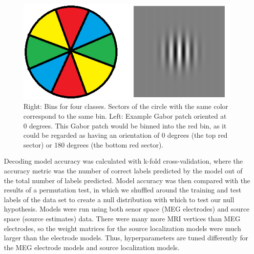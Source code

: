 \documentclass[../main.tex]{subfiles}
\begin{document}
\begin{figure}
    \centering
    \includegraphics{figures/methods/gabor_bins.png}
    \caption{Right: Bins for four classes. Sectors of the circle with the same color correspond to the same bin. Left: Example Gabor patch oriented at 0 degrees. This Gabor patch would be binned into the red bin, as it could be regarded as having an orientation of 0 degrees (the top red sector) or 180 degrees (the bottom red sector).}
    \label{gabor_bins}
\end{figure}

Decoding model accuracy was calculated with k-fold cross-validation, where the accuracy metric was the number of correct labels predicted by the model out of the total number of labels predicted. Model accuracy was then compared with the results of a permutation test, in which we shuffled around the training and test labels of the data set to create a null distribution with which to test our null hypothesis. Models were run using both senor space (MEG electrodes) and source space (source estimates) data. There were many more MRI vertices than MEG electrodes, so the weight matrices for the source localization models were much larger than the electrode models. Thus, hyperparameters are tuned differently for the MEG electrode models and source localization models.
\end{document}
